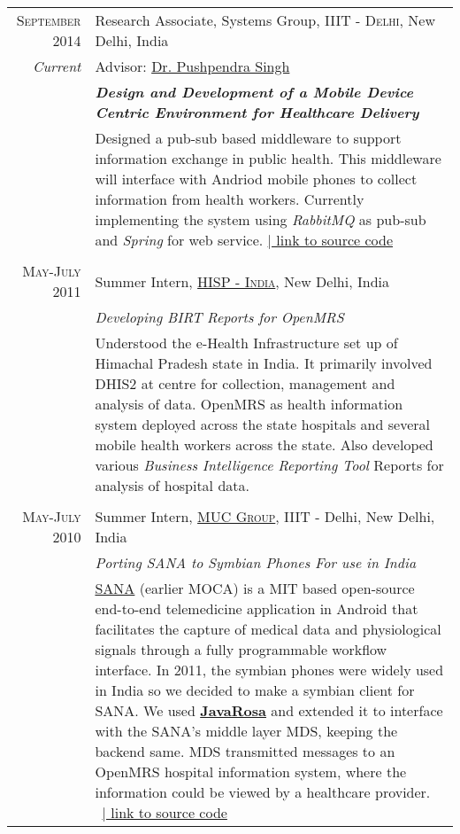 \documentclass[a4paper,10pt]{article} %
\begin{document}
\begin{tabular}{r|p{13cm}}
\textsc{September 2014} & Research Associate, Systems Group,\textsc{ IIIT - Delhi}, New Delhi, India \\ %
\emph{Current} & Advisor: \href{http://www.iiitd.edu.in/~pushpendra/}{Dr. Pushpendra Singh} \\
&\textbf \emph{Design and Development of a Mobile Device Centric Environment for Healthcare Delivery} \\
 & \small{Designed a pub-sub based middleware to support information exchange in public health. This middleware will interface with Andriod mobile phones to collect information from health workers.
Currently implementing the system using \textit{RabbitMQ} as pub-sub and \textit{Spring} for web service.  \href{https://github.com/am2990/Sahyog}{\hfill | link to source code} } \\
\multicolumn{2}{c}{} \\


\textsc{May-July 2011} & Summer Intern, \href{http://hispindia.org/}{\textsc{HISP - India}}, New Delhi, India \emph{}\\
\textsc{} & \emph{Developing BIRT Reports for OpenMRS }\\ 
& \small{ Understood the e-Health Infrastructure set up of Himachal Pradesh state in India. It primarily involved DHIS2 at centre for collection, management and analysis of data. \newline OpenMRS as health information system deployed across the state hospitals and several mobile health workers across the state. Also developed various \textit{Business Intelligence Reporting Tool} Reports for analysis of hospital data. }\\
\multicolumn{2}{c}{} \\


\textsc{May-July 2010} & Summer Intern, \href{http://muc.iiitd.edu.in/muc/}{\textsc{MUC Group}}, IIIT - Delhi, New Delhi, India \emph{}\\
\textsc{} & \emph{Porting SANA to Symbian Phones For use in India}\\ 
& \small{\href{http://sana.mit.edu}{SANA} (earlier MOCA) is a MIT based open-source end-to-end telemedicine application in Android that facilitates the capture of medical data and physiological signals through a fully programmable workflow interface. In 2011, the symbian phones were widely used in India so we decided to make a symbian client for SANA. We used \href{http://www.dimagi.com/javarosa/}{\textbf{JavaRosa}} and extended it to interface with the SANA's middle layer MDS, keeping the backend same. MDS transmitted messages to an OpenMRS hospital information system, where the information could be viewed by a healthcare provider.} \ \href{https://code.google.com/p/moca/}{\hfill | link to source code}
\end{tabular}
\end{document}
